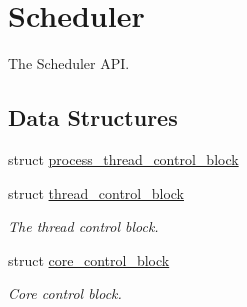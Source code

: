 \hypertarget{group__scheduler}{}\section{Scheduler}
\label{group__scheduler}


The Scheduler A\+PI.  


\subsection*{Data Structures}
\begin{DoxyCompactItemize}
\item 
struct \hyperlink{structprocess__thread__control__block}{process\+\_\+thread\+\_\+control\+\_\+block}
\item 
struct \hyperlink{structthread__control__block}{thread\+\_\+control\+\_\+block}
\begin{DoxyCompactList}\small\item\em The thread control block. \end{DoxyCompactList}\item 
struct \hyperlink{structcore__control__block}{core\+\_\+control\+\_\+block}
\begin{DoxyCompactList}\small\item\em Core control block. \end{DoxyCompactList}\end{DoxyCompactItemize}
